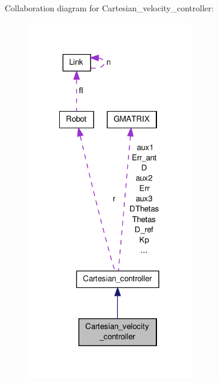 Collaboration diagram for Cartesian\-\_\-velocity\-\_\-controller\-:\nopagebreak
\begin{figure}[H]
\begin{center}
\leavevmode
\includegraphics[width=206pt]{classCartesian__velocity__controller__coll__graph}
\end{center}
\end{figure}
